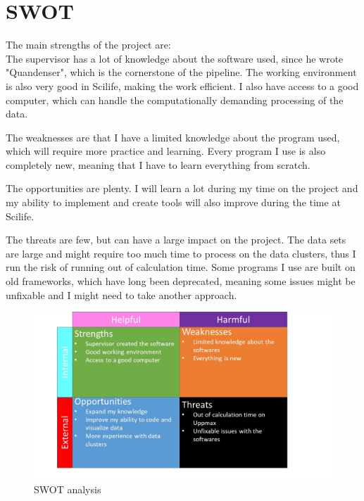 \section{SWOT}

The main strengths of the project are:\\
The supervisor has a lot of knowledge about the software used, since he wrote "Quandenser", which is the cornerstone of the pipeline. The working environment is also very good in Scilife, making the work efficient. I also have access to a good computer, which can handle the computationally demanding processing of the data.

The weaknesses are that I have a limited knowledge about the program used, which will require more practice and learning. Every program I use is also completely new, meaning that I have to learn everything from scratch.

The opportunities are plenty. I will learn a lot during my time on the project and my ability to implement and create tools will also improve during the time at Scilife.

The threats are few, but can have a large impact on the project. The data sets are large and might require too much time to process on the data clusters, thus I run the risk of running out of calculation time. Some programs I use are built on old frameworks, which have long been deprecated, meaning some issues might be unfixable and I might need to take another approach.

\begin{figure}[H]
    \centering
    \includegraphics[width=\textwidth,height=\textheight,keepaspectratio]{Pictures/SWOT.jpg}
    \caption{SWOT analysis}
\end{figure}
